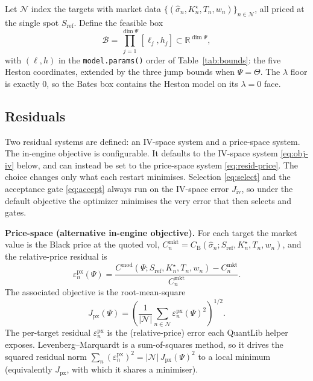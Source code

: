 \documentclass[a4paper, 11pt, reqno]{amsart}
\newcommand{\Real}{\mathbb{R}}
\begin{document}
		Let $\mathcal{N}$ index the targets with market data $\{(\hat\sigma_n, K^\star_n, T_n, w_n)\}_{n\in\mathcal{N}}$,
		all priced at the single spot $S_{\mathrm{ref}}$. Define the feasible box
		\begin{equation}\label{eq:box}
			\mathcal{B} = \prod_{j=1}^{\dim\Psi} [\ell_j, h_j] \subset \Real^{\dim\Psi},
		\end{equation}
		with $(\ell,h)$ in the \texttt{model.params()} order of Table~\ref{tab:bounds}: the five Heston
		coordinates, extended by the three jump bounds when $\Psi=\Theta$. The $\lambda$ floor is exactly
		$0$, so the Bates box contains the Heston model on its $\lambda=0$ face.

		\subsection{Residuals}
			Two residual systems are defined: an IV-space system and a price-space system. The in-engine
			objective is configurable. It defaults to the IV-space system \eqref{eq:obj-iv} below, and can
			instead be set to the price-space system \eqref{eq:resid-price}. The choice changes only what
			each restart minimises. Selection \eqref{eq:select} and the acceptance gate \eqref{eq:accept}
			always run on the IV-space error $J_{\mathrm{iv}}$, so under the default objective the optimizer
			minimises the very error that then selects and gates.
	
			\textbf{Price-space (alternative in-engine objective).} For each target the market value is the
			Black price at the quoted vol, $C^{\mathrm{mkt}}_n = C_{\mathrm{B}}(\hat\sigma_n; S_{\mathrm{ref}}, K^\star_n, T_n, w_n)$,
			and the relative-price residual is
			\begin{equation}\label{eq:resid-price}
				\varepsilon^{\mathrm{px}}_n(\Psi)
				= \frac{C^{\mathrm{mod}}(\Psi; S_{\mathrm{ref}}, K^\star_n, T_n, w_n) - C^{\mathrm{mkt}}_n}{C^{\mathrm{mkt}}_n}.
			\end{equation}
			The associated objective is the root-mean-square
			\begin{equation}\label{eq:obj-price}
				J_{\mathrm{px}}(\Psi)
				= \left( \frac{1}{|\mathcal{N}|} \sum_{n\in\mathcal{N}} \varepsilon^{\mathrm{px}}_n(\Psi)^2 \right)^{1/2}.
			\end{equation}
			The per-target residual $\varepsilon^{\mathrm{px}}_n$ is the (relative-price) error each
			QuantLib helper exposes. Levenberg--Marquardt \citep{marquardt1963} is a sum-of-squares
			method, so it drives the squared residual norm
			$\sum_{n}(\varepsilon^{\mathrm{px}}_n)^2 = |\mathcal{N}|\,J_{\mathrm{px}}(\Psi)^2$ to a local
			minimum (equivalently $J_{\mathrm{px}}$, with which it shares a minimiser).
		
\end{document}
